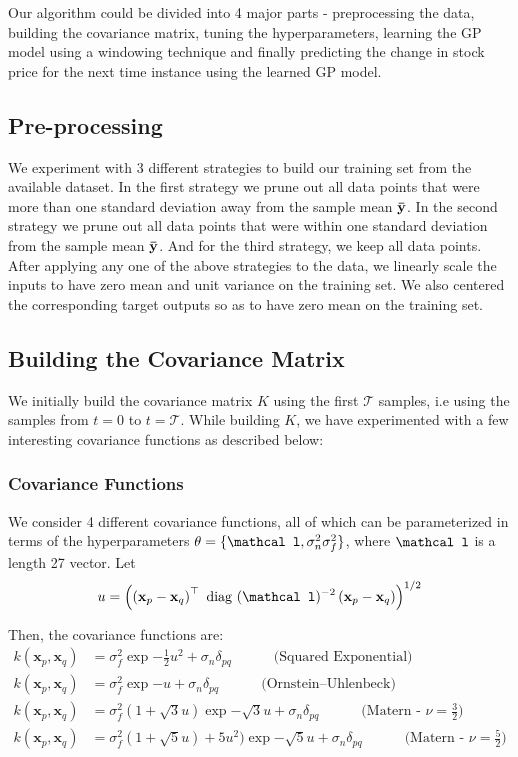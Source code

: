 \documentclass{article} %
\def\bfx{\mathbf x}
\def\bftheta{\mathbf \theta}
\def\bfl{\mathbf \mathcal l}
\def\diag{\mbox{ diag }}
\begin{document}
Our algorithm could be divided into 4 major parts - preprocessing the data, building the covariance matrix, tuning the hyperparameters, learning the GP model using a windowing technique and finally predicting the change in stock price for the next time instance using the learned GP model. 

\subsection{Pre-processing}
\label{sec:strategy}

We experiment with 3 different strategies to build our training set from the available dataset. In the first strategy we prune out all data points that were more than one standard deviation away from the sample mean $\bf\bar{y}$. In the second strategy we prune out all data points that were within one standard deviation from the sample mean $\bf\bar{y}$. And for the third strategy, we keep all data points. After applying any one of the above strategies to the data, we linearly scale the inputs to have zero mean and unit variance on the training set. We also centered the corresponding target outputs so as to have zero mean on the training set.

\subsection{Building the Covariance Matrix}

We initially build the covariance matrix $K$ using the first $\mathcal{T}$ samples, i.e using the samples from $t = 0$ to $t = \mathcal{T}$. While building $K$, we have experimented with a few interesting covariance functions as described below:  

\subsubsection{Covariance Functions}
We consider 4 different covariance functions, all of which can be parameterized in terms of the hyperparameters $\bftheta = \{\bfl, \sigma_n^2 \sigma_f^2\}$, where $\bfl$ is a length 27 vector.
Let
\begin{equation}
	u = \left( \left( \bfx_p - \bfx_q \right)^\top \diag(\bfl)^{-2} \left( \bfx_p - \bfx_q \right) \right)^{1/2}
\end{equation}

Then, the covariance functions are:
\begin{align}
	k(\bfx_p, \bfx_q) &= \sigma_f^2 \exp{- \frac{1}{2} u^2} + \sigma_n \delta_{pq} \quad \quad \quad \mbox{(Squared Exponential)}   \\
	k(\bfx_p, \bfx_q) &= \sigma_f^2 \exp{- u} + \sigma_n \delta_{pq} \quad \quad \quad \mbox{(Ornstein–Uhlenbeck)}   \\
	k(\bfx_p, \bfx_q) &= \sigma_f^2 \left( 1 + \sqrt{3} u \right) \exp{- \sqrt{3}  u} + \sigma_n \delta_{pq} \quad \quad \quad \mbox{(Matern - $\nu = \frac{3}{2}$)}   \\
	k(\bfx_p, \bfx_q) &= \sigma_f^2 \left( 1 + \sqrt{5} u \right) + 5 u^2) \exp{- \sqrt{5} u} + \sigma_n \delta_{pq} \quad \quad \quad \mbox{(Matern  - $\nu = \frac{5}{2}$)}
\end{align}
\end{document}

